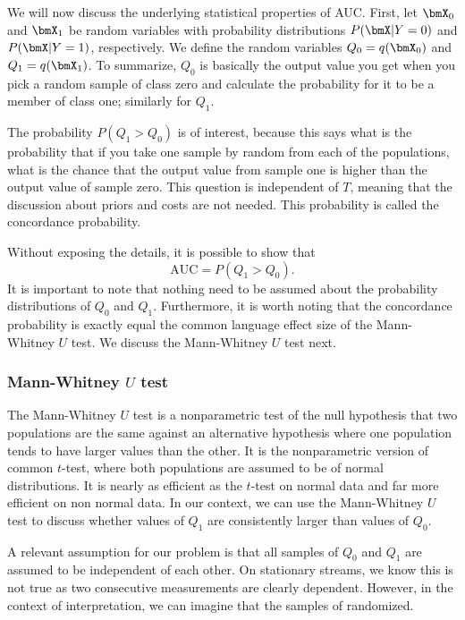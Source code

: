 We will now discuss the underlying statistical properties of AUC. First, let $\bmX_0$ and $\bmX_1$ be random variables with probability distributions $P(\bmX | Y = 0)$ and $P(\bmX | Y = 1)$, respectively.  We define the random variables $Q_0 = q(\bmX_0)$ and $Q_1 = q(\bmX_1)$.  To summarize, $Q_0$ is basically the output value you get when you pick a random sample of class zero and calculate the probability for it to be a member of class one; similarly for $Q_1$.  

The probability $P(Q_1 > Q_0)$ is of interest, because this says what is the probability that if you take one sample by random from each of the populations, what is the chance that the output value from sample one is higher than the output value of sample zero.  This question is independent of $T$, meaning that the discussion about priors and costs are not needed. This probability is called the concordance probability.

Without exposing the details, it is possible to show that
\begin{equation}
\label{eq:concurrent}
\mbox{AUC} = P(Q_1 > Q_0).
\end{equation}
It is important to note that nothing need to be assumed about the probability distributions of $Q_0$ and $Q_1$.  Furthermore, it is worth noting that the concordance probability is exactly equal the common language effect size of the Mann-Whitney $U$ test.  We discuss the Mann-Whitney $U$ test next.

\subsubsection{Mann-Whitney $U$ test}
\label{sec:U}

The Mann-Whitney $U$ test  \cite{Man47} is a nonparametric test of the null hypothesis that two populations are the same against an alternative hypothesis where one population tends to have larger values than the other.  It is the nonparametric version of common $t$-test, where both populations are assumed to be of normal distributions.  It is nearly as efficient as the $t$-test on normal data and far more efficient on non normal data.  In our context, we can use the Mann-Whitney $U$ test to discuss whether values of $Q_1$ are consistently larger than values of $Q_0$.  

A relevant assumption for our problem is that all samples of $Q_0$ and $Q_1$ are assumed to be independent of each other.  On stationary streams, we know this is not true as two consecutive measurements are clearly dependent.  However, in the context of interpretation, we can imagine that the samples of randomized.  


